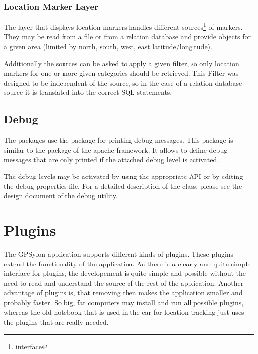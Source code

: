 \documentclass[a4paper]{article} %
\begin{document}
\subsubsection{Location Marker Layer}
\label{SoftwareDesignOfTheGpstoolPackage-LocationMarkerLayer}

The layer that displays location markers handles different
sources\footnote{interface
}
of markers. They may be read from a file or from a relation database
and provide  objects for a given area
(limited by north, south, west, east latitude/longitude).

Additionally the sources can be asked to apply a given filter, so only
location markers for one or more given categories should be
retrieved. This Filter was designed to be independent of the source,
so in the case of a relation database source it is translated into the
correct SQL statements.


\subsection{Debug}
\label{SoftwareDesignOfTheGpstoolPackage-Debug}

The  packages use the
 package for printing debug
messages. This package is similar to the  package
of the apache framework. It allows to define debug messages that are
only printed if the attached debug level is activated.

The debug levels may be activated by using the appropriate API or by
editing the debug properties file. For a detailed description of the
 class, please see the design document of the debug
utility. 

\section{Plugins}
\label{SoftwareDesignOfTheGpstoolPackage-Plugins}

The GPSylon application supports different kinds of plugins. These
plugins extend the functionality of the application. As there is a
clearly and quite simple interface for plugins, the developement is
quite simple and possible without the need to read and understand the
source of the rest of the application. Another advantage of plugins
is, that removing then makes the application smaller and probably
faster. So big, fat computers may install and run all possible
plugins, whereas the old notebook that is used in the car for location
tracking just uses the plugins that are really needed. 
\end{document}
